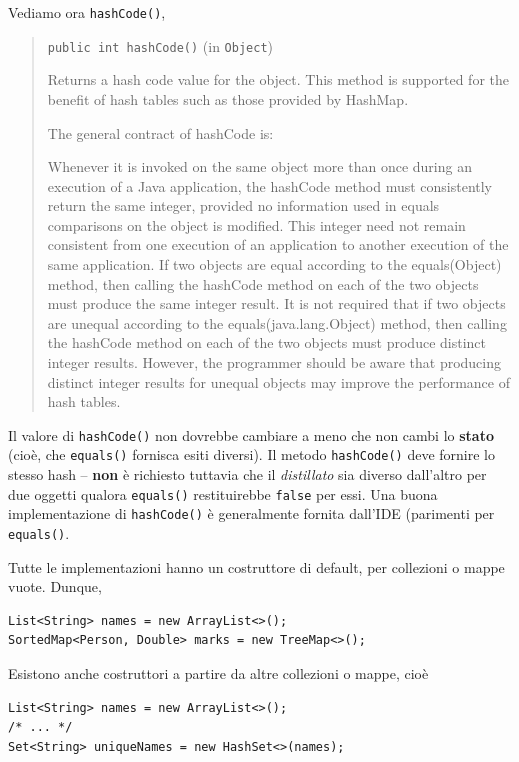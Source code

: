 \documentclass[\fontsizeclass,twocolumn]{\classname}
\theoremstyle{definition}
\theoremstyle{definition}
\begin{document}
Vediamo ora \texttt{hashCode()},
\begin{quote}
    \footnotesize{\texttt{public int hashCode()} (in \texttt{Object})

Returns a hash code value for the object. This method is supported for the benefit of hash tables such as those provided by HashMap.

The general contract of hashCode is:

    Whenever it is invoked on the same object more than once during an execution of a Java application, the hashCode method must consistently return the same integer, provided no information used in equals comparisons on the object is modified. This integer need not remain consistent from one execution of an application to another execution of the same application.
    If two objects are equal according to the equals(Object) method, then calling the hashCode method on each of the two objects must produce the same integer result.
    It is not required that if two objects are unequal according to the equals(java.lang.Object) method, then calling the hashCode method on each of the two objects must produce distinct integer results. However, the programmer should be aware that producing distinct integer results for unequal objects may improve the performance of hash tables.
}
\end{quote}

Il valore di \texttt{hashCode()} non dovrebbe cambiare a meno che non cambi lo
\textbf{stato} (cioè, che \texttt{equals()} fornisca esiti diversi). Il metodo
\texttt{hashCode()} deve fornire lo stesso hash -- \textbf{non} è richiesto
tuttavia che il \emph{distillato} sia diverso dall'altro per due oggetti
qualora \texttt{equals()} restituirebbe \texttt{false} per essi. Una buona
implementazione di \texttt{hashCode()} è generalmente fornita dall'IDE
(parimenti per \texttt{equals()}.

Tutte le implementazioni hanno un costruttore di default, per collezioni o
mappe vuote. Dunque,

\begin{lstlisting}
List<String> names = new ArrayList<>();
SortedMap<Person, Double> marks = new TreeMap<>();
\end{lstlisting}

Esistono anche costruttori a partire da altre collezioni o mappe, cioè

\begin{lstlisting}
List<String> names = new ArrayList<>();
/* ... */
Set<String> uniqueNames = new HashSet<>(names);
\end{lstlisting}
\end{document}
